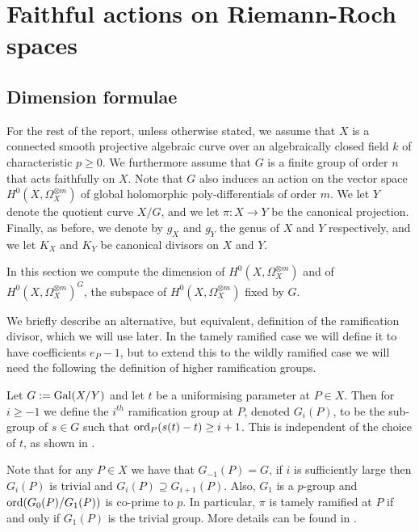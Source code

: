 \chapter{Faithful actions on Riemann-Roch spaces} \label{Chapter:Faithfulactions}
\section{Dimension formulae}\label{dimsection}



For the rest of the report, unless otherwise stated, we assume that $X$ is a connected smooth projective algebraic curve over an algebraically closed field $k$ of characteristic $p \geq 0$.
We furthermore assume that $G$ is a finite group of order $n$ that acts faithfully on $X$.
Note that $G$ also induces an action on the vector space $H^0(X,\Omega_X^{\otimes m})$ of global holomorphic poly-differentials of order $m$.
We let $Y$ denote the quotient curve $X/G$, and we let $\pi:X\rightarrow Y$ be the canonical projection.
Finally, as before, we denote by $g_X$ and $g_Y$ the genus of $X$ and $Y$ respectively, and we let $K_X$ and $K_Y$ be canonical divisors on $X$ and $Y$.


In this section we compute the dimension of $H^0(X,\Omega_X^{\otimes m})$ and of $H^0(X,\Omega_X^{\otimes m})^G$, the subspace of $H^0(X,\Omega_X^{\otimes m})$ fixed by $G$.


We briefly describe an alternative, but equivalent, definition of the ramification divisor, which we will use later.
In the tamely ramified case we will define it to have coefficients $e_P-1$, but to extend this to the wildly ramified case we will need the following the definition of higher ramification groups.


\begin{defn}
Let $G:=\operatorname{Gal}(X/Y)$ and let $t$ be a uniformising parameter at $P\in X$.
Then for $i\geq -1$ we define the $i^{th}$ ramification group at $P$, denoted $G_i(P)$, to be the sub-group of $s\in G$ such that $\operatorname{ord}_P(s(t)-t)\geq i+1$.
This is	independent of the choice of $t$, as shown in \cite[Chap. IV, \S 1, pg. 62]{localfields}.
\end{defn}

Note that for any $P\in X$ we have that $G_{-1}(P)=G$, if $i$ is sufficiently large then $G_i(P)$ is trivial and $G_i(P)\supseteq G_{i+1}(P)$.
Also, $G_1$ is a $p$-group and $\operatorname{ord}(G_0(P)/G_1(P))$ is co-prime to $p$.
In particular, $\pi$ is tamely ramified at $P$ if and only if $G_1(P)$ is the trivial group.
More details can be found in \cite[Chap. IV, \S 1]{localfields}.%

